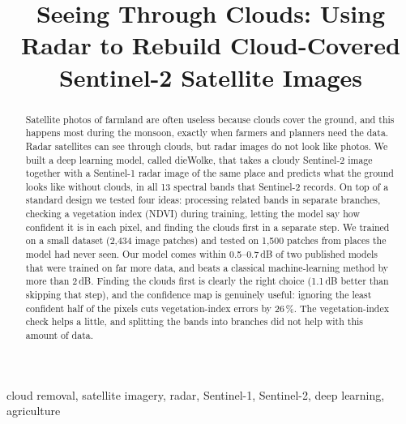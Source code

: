 \documentclass[conference]{IEEEtran}
\begin{document}
\title{Seeing Through Clouds: Using Radar to Rebuild Cloud-Covered Sentinel-2 Satellite Images}

\author{
\and
{}
}

\maketitle

\begin{abstract}
Satellite photos of farmland are often useless because clouds cover the ground, and this happens
most during the monsoon, exactly when farmers and planners need the data. Radar satellites can
see through clouds, but radar images do not look like photos. We built a deep learning model,
called dieWolke, that takes a cloudy Sentinel-2 image together with a Sentinel-1 radar image of
the same place and predicts what the ground looks like without clouds, in all 13 spectral bands
that Sentinel-2 records. On top of a standard design we tested four ideas: processing related
bands in separate branches, checking a vegetation index (NDVI) during training, letting the model
say how confident it is in each pixel, and finding the clouds first in a separate step. We
trained on a small dataset (2,434 image patches) and tested on 1,500 patches from places the
model had never seen. Our model comes within 0.5--0.7\,dB of two published models that were
trained on far more data, and beats a classical machine-learning method by more than 2\,dB.
Finding the clouds first is clearly the right choice (1.1\,dB better than skipping that step),
and the confidence map is genuinely useful: ignoring the least confident half of the pixels cuts
vegetation-index errors by 26\,\%. The vegetation-index check helps a little, and splitting the
bands into branches did not help with this amount of data.
\end{abstract}

\begin{IEEEkeywords}
cloud removal, satellite imagery, radar, Sentinel-1, Sentinel-2, deep learning, agriculture
\end{IEEEkeywords}
\end{document}
